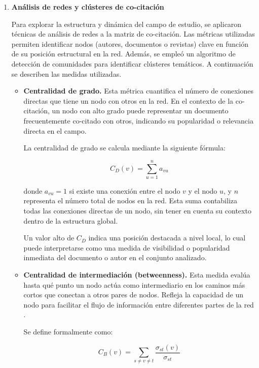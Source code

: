 \documentclass[twoside, twocolumn]{article}
\newcommand{\1}{\mathds{1}}						%
\begin{document}
\begin{enumerate}
\item \textbf{Análisis de redes y clústeres de co-citación}


Para explorar la estructura y dinámica del campo de estudio, se aplicaron técnicas de análisis de redes a la matriz de co-citación. Las métricas utilizadas permiten identificar nodos (autores, documentos o revistas) clave en función de su posición estructural en la red. Además, se empleó un algoritmo de detección de comunidades para identificar clústeres temáticos. A continuación se describen las medidas utilizadas.

\begin{itemize}
    \item \textbf{Centralidad de grado.} Esta métrica cuantifica el número de conexiones directas que tiene un nodo con otros en la red. En el contexto de la co-citación, un nodo con alto grado puede representar un documento frecuentemente co-citado con otros, indicando su popularidad o relevancia directa en el campo.  \cite{Freeman1978}

    La centralidad de grado se calcula mediante la siguiente fórmula:

    \begin{equation}
        C_D(v) = \sum_{u=1}^{n} a_{vu}
    \end{equation}

    donde $a_{vu} = 1$ si existe una conexión entre el nodo $v$ y el nodo $u$, y $n$ representa el número total de nodos en la red. Esta suma contabiliza todas las conexiones directas de un nodo, sin tener en cuenta su contexto dentro de la estructura global.

    Un valor alto de $C_D$ indica una posición destacada a nivel local, lo cual puede interpretarse como una medida de visibilidad o popularidad inmediata del documento o autor en el conjunto analizado.

    \item \textbf{Centralidad de intermediación (betweenness).} Esta medida evalúa hasta qué punto un nodo actúa como intermediario en los caminos más cortos que conectan a otros pares de nodos. Refleja la capacidad de un nodo para facilitar el flujo de información entre diferentes partes de la red \cite{Brandes2001}.

    Se define formalmente como:

    \begin{equation}
        C_B(v) = \sum_{s \neq v \neq t} \frac{\sigma_{st}(v)}{\sigma_{st}}
    \end{equation}


\end{itemize}
\end{enumerate}
\end{document}

